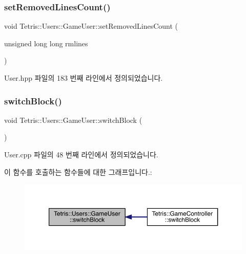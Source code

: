\subsubsection{\texorpdfstring{set\+Removed\+Lines\+Count()}{setRemovedLinesCount()}}
{\footnotesize\ttfamily void Tetris\+::\+Users\+::\+Game\+User\+::set\+Removed\+Lines\+Count (\begin{DoxyParamCaption}\item[{unsigned long long}]{rmlines }\end{DoxyParamCaption})\hspace{0.3cm}{\ttfamily [inline]}}



User.\+hpp 파일의 183 번째 라인에서 정의되었습니다.

\mbox{\label{class_tetris_1_1_users_1_1_game_user_a1d1efa857420c82248fd12da9c08ef77}} 
\subsubsection{\texorpdfstring{switch\+Block()}{switchBlock()}\hspace{0.1cm}{\footnotesize\ttfamily [1/2]}}
{\footnotesize\ttfamily void Tetris\+::\+Users\+::\+Game\+User\+::switch\+Block (\begin{DoxyParamCaption}{ }\end{DoxyParamCaption})}



User.\+cpp 파일의 48 번째 라인에서 정의되었습니다.

이 함수를 호출하는 함수들에 대한 그래프입니다.\+:
\nopagebreak
\begin{figure}[H]
\begin{center}
\leavevmode
\includegraphics[width=350pt]{class_tetris_1_1_users_1_1_game_user_a1d1efa857420c82248fd12da9c08ef77_icgraph}
\end{center}
\end{figure}
\mbox{\label{class_tetris_1_1_users_1_1_game_user_a1d1efa857420c82248fd12da9c08ef77}} 
